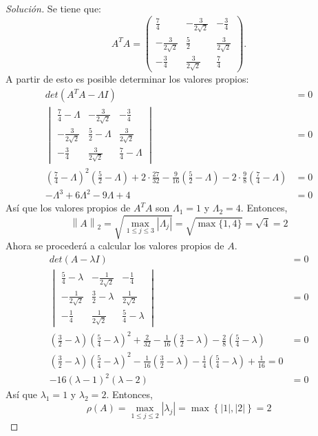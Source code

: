 \documentclass[12pt]{book}
\newcommand\norm[1]{\left\lVert#1\right\rVert}
\newcommand\abs[1]{\left\lvert#1\right\rvert}
\newenvironment{solucion}
  {\renewcommand\qedsymbol{$\square$}\begin{proof}[Solución]}
  {\end{proof}}
\begin{document}
\begin{solucion}
Se tiene que:
\[A^TA=\begin{pmatrix}
\frac{7}{4} & -\frac{3}{2\sqrt{2}} & -\frac{3}{4}\\[8pt]
-\frac{3}{2\sqrt{2}} & \frac{5}{2} & \frac{3}{2\sqrt{2}}\\[8pt]
-\frac{3}{4} & \frac{3}{2\sqrt{2}} & \frac{7}{4}
\end{pmatrix}.\]
A partir de esto es posible determinar los valores propios:
\begin{align*}
    det(A^TA-\Lambda I)&=0\\
    \begin{vmatrix}
        \frac{7}{4}-\Lambda & -\frac{3}{2\sqrt{2}} & -\frac{3}{4}\\[8pt]
        -\frac{3}{2\sqrt{2}} & \frac{5}{2}-\Lambda & \frac{3}{2\sqrt{2}}\\[8pt]
        -\frac{3}{4} & \frac{3}{2\sqrt{2}} & \frac{7}{4}-\Lambda
    \end{vmatrix}&=0\\
\left(\frac{7}{4}-\Lambda\right)^2\left(\frac{5}{2}-\Lambda\right)+2\cdot\frac{27}{32}-\frac{9}{16}\left(\frac{5}{2}-\Lambda\right)-2\cdot\frac{9}{8}\left(\frac{7}{4}-\Lambda\right)&=0\\
-\Lambda^3+6\Lambda^2-9\Lambda+4&=0
\end{align*}
Así que los valores propios de $A^TA$ son $\Lambda_1=1$ y $\Lambda_2=4$. Entonces,
\[ \norm{A}_2=\sqrt{\max_{1\leq j\leq3}\abs{\Lambda_j}}=\sqrt{\max\{1,4\}}=\sqrt{4}=2\]
Ahora se procederá a calcular los valores propios de $A$.
\begin{align*}
    det(A-\lambda I)&=0\\
    \begin{vmatrix}
    \frac{5}{4}-\lambda & -\frac{1}{2\sqrt{2}} & -\frac{1}{4}\\
    -\frac{1}{2\sqrt{2}} & \frac{3}{2}-\lambda & \frac{1}{2\sqrt{2}}\\
    -\frac{1}{4} & \frac{1}{2\sqrt{2}} & \frac{5}{4}-\lambda
\end{vmatrix} &=0\\
\left(\frac{3}{2}-\lambda\right)\left(\frac{5}{4}-\lambda\right)^2+\frac{2}{32}-\frac{1}{16}\left(\frac{3}{2}-\lambda\right)-\frac{2}{8}\left(\frac{5}{4}-\lambda\right)&=0\\
\left(\frac{3}{2}-\lambda\right)\left(\frac{5}{4}-\lambda\right)^2-\frac{1}{16}\left(\frac{3}{2}-\lambda\right)-\frac{1}{4}\left(\frac{5}{4}-\lambda\right)+\frac{1}{16}=0\\
-16(\lambda-1)^2(\lambda-2)&=0
\end{align*}
Así que $\lambda_1=1$ y $\lambda_2=2$. Entonces,
\[
    \rho(A)=\max_{1\leq j\leq2}\abs{\lambda_j}=\max\left\{\abs{1},\abs{2}\right\}=2
\]
\end{solucion}
\end{document}
